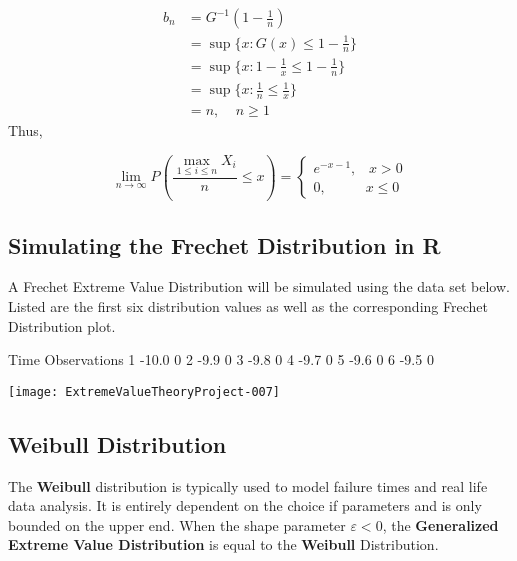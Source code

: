 \documentclass[11pt,a4paper]{article}
\theoremstyle{plain}
\begin{document}
\begin{equation*}
\begin{split}
b_n & = G^{-1}(1-\frac{1}{n})\\
& = \sup \{x:G(x) \leq 1-\frac{1}{n} \}\\
& = \sup \{x:1- \frac{1}{x} \leq 1-\frac{1}{n} \}\\
& = \sup \{x: \frac{1}{n} \leq \frac{1}{x} \}\\
& = n, \;\;\;\; n \geq 1
\end{split}
\end{equation*}
Thus,

\begin{center}

\[
  \lim_{n \rightarrow \infty}P(\frac{\max_{1 \leq i \leq n }X_i}{n}\leq x)=\left\{
  \begin{array}{ll}
  e^{-x-1}, \;\;\; x> 0\\
  0,\;\;\;\;\;\;\;\;\;\; x \leq 0
  \end{array}
  \right.
  \]

\end{center}

\subsection*{Simulating the Frechet Distribution in R} 
A Frechet Extreme Value Distribution will be simulated using the data set below. Listed are the first six distribution values as well as the corresponding Frechet Distribution plot.
\begin{Schunk}
\begin{Soutput}
   Time Observations
1 -10.0            0
2  -9.9            0
3  -9.8            0
4  -9.7            0
5  -9.6            0
6  -9.5            0
\end{Soutput}
\end{Schunk}

\texttt{[image: ExtremeValueTheoryProject-007]}


\newpage
\subsection*{Weibull Distribution}
The \textbf{Weibull} distribution is typically used to model failure times and real life data analysis.
It is entirely dependent on the choice if parameters and is only bounded on the upper end. 
When the shape parameter $\varepsilon<0$, the \textbf{Generalized Extreme Value Distribution} is equal to the \textbf{Weibull} Distribution.
\end{document}
